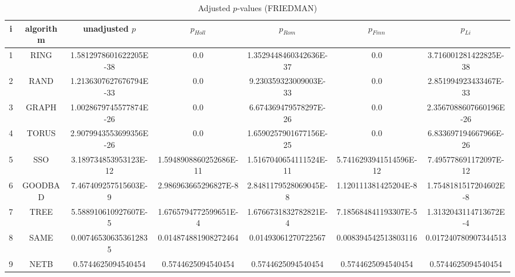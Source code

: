 \documentclass[a4paper,10pt]{article}
\begin{document}
\begin{landscape}
\begin{table}[!htp]
\centering\scriptsize
\caption{Adjusted $p$-values (FRIEDMAN)}
\begin{tabular}{ccccccc}
i&algorithm&unadjusted $p$&$p_{Holl}$&$p_{Rom}$&$p_{Finn}$&$p_{Li}$\\
\hline
1& RING&1.5812978601622205E-38&0.0&1.3529448460342636E-37&0.0&3.716001281422825E-38\\
2& RAND&1.2136307627676794E-33&0.0&9.230359323009003E-33&0.0&2.851994923433467E-33\\
3& GRAPH&1.0028679745577874E-26&0.0&6.674369479578297E-26&0.0&2.3567088607660196E-26\\
4& TORUS&2.9079943553699356E-26&0.0&1.6590257901677156E-25&0.0&6.833697194667966E-26\\
5& SSO&3.189734853953123E-12&1.5948908860252686E-11&1.5167040654111524E-11&5.7416293941514596E-12&7.495778691172097E-12\\
6& GOODBAD&7.467409257515603E-9&2.986963665296827E-8&2.8481179528069045E-8&1.120111381425204E-8&1.7548181517204602E-8\\
7& TREE&5.588910610927607E-5&1.6765794772599651E-4&1.6766731832782821E-4&7.185684841193307E-5&1.3132043114713672E-4\\
8& SAME&0.007465306353612835&0.014874881908272464&0.01493061270722567&0.008394542513803116&0.017240780907344513\\
9& NETB&0.5744625094540454&0.5744625094540454&0.5744625094540454&0.5744625094540454&0.5744625094540454\\
\hline
\end{tabular}
\end{table}


\newpage


\end{landscape}
\end{document}

